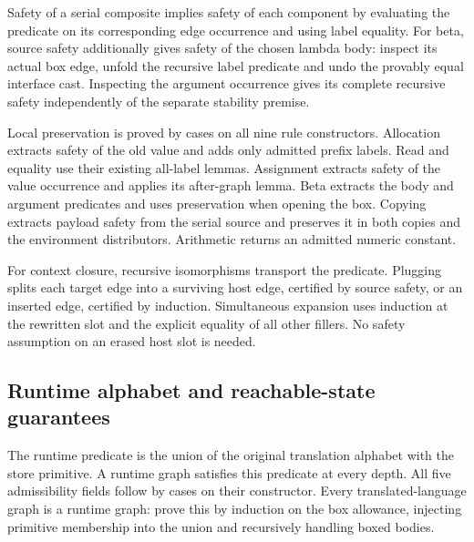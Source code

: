 
Safety of a serial composite implies safety of each component by evaluating
the predicate on its corresponding edge occurrence and using label equality.
For beta, source safety additionally gives safety of the chosen lambda body:
inspect its actual box edge, unfold the recursive label predicate and undo
the provably equal interface cast. Inspecting the argument occurrence gives
its complete recursive safety independently of the separate stability premise.





Local preservation is proved by cases on all nine rule constructors.
Allocation extracts safety of the old value and adds only admitted prefix
labels. Read and equality use their existing all-label lemmas. Assignment
extracts safety of the value occurrence and applies its after-graph lemma.
Beta extracts the body and argument predicates and uses preservation when
opening the box. Copying extracts payload safety from the serial source and
preserves it in both copies and the environment distributors. Arithmetic
returns an admitted numeric constant.

For context closure, recursive isomorphisms transport the predicate. Plugging
splits each target edge into a surviving host edge, certified by source safety,
or an inserted edge, certified by induction. Simultaneous expansion uses
induction at the rewritten slot and the explicit equality of all other
fillers. No safety assumption on an erased host slot is needed.



\subsection{Runtime alphabet and reachable-state guarantees}

The runtime predicate is the union of the original translation alphabet with
the store primitive. A runtime graph satisfies this predicate at every depth.
All five admissibility fields follow by cases on their constructor. Every
translated-language graph is a runtime graph: prove this by induction on the
box allowance, injecting primitive membership into the union and recursively
handling boxed bodies.


